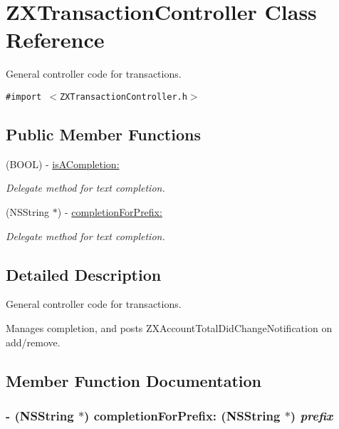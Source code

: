\hypertarget{interface_z_x_transaction_controller}{
\section{ZXTransactionController Class Reference}
\label{interface_z_x_transaction_controller}
}
General controller code for transactions.  


{\tt \#import $<$ZXTransactionController.h$>$}

\subsection*{Public Member Functions}
\begin{CompactItemize}
\item 
(BOOL) - \hyperlink{interface_z_x_transaction_controller_4cdf7af804db8c1382af072cf497113e}{isACompletion:}
\begin{CompactList}\small\item\em Delegate method for text completion. \item\end{CompactList}\item 
(NSString $\ast$) - \hyperlink{interface_z_x_transaction_controller_29315035e584855a5723447f23992560}{completionForPrefix:}
\begin{CompactList}\small\item\em Delegate method for text completion. \item\end{CompactList}\end{CompactItemize}


\subsection{Detailed Description}
General controller code for transactions. 

Manages completion, and posts ZXAccountTotalDidChangeNotification on add/remove. 

\subsection{Member Function Documentation}
\hypertarget{interface_z_x_transaction_controller_29315035e584855a5723447f23992560}{
\subsubsection[{completionForPrefix:}]{\setlength{\rightskip}{0pt plus 5cm}- (NSString $\ast$) completionForPrefix: (NSString $\ast$) {\em prefix}}}
\label{interface_z_x_transaction_controller_29315035e584855a5723447f23992560}


